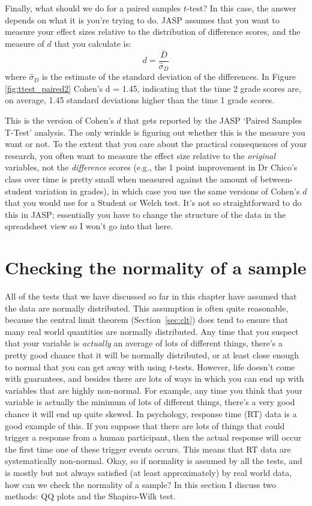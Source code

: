 
Finally, what should we do for a paired samples $t$-test? In this case, the answer depends on what it is you're trying to do. JASP assumes that you want to measure your effect sizes relative to the distribution of difference scores, and the measure of $d$ that you calculate is: 
$$
d = \frac{\bar{D}}{\hat{\sigma}_D}
$$
where $\hat{\sigma}_D$ is the estimate of the standard deviation of the differences. In Figure \ref{fig:ttest_paired2} Cohen's d = 1.45, indicating that the time 2 grade scores are, on average, 1.45 standard deviations higher than the time 1 grade scores.

This is the version of Cohen's $d$ that gets reported by the JASP `Paired Samples T-Test' analysis. The only wrinkle is figuring out whether this is the measure you want or not. To the extent that you care about the practical consequences of your research, you often want to measure the effect size relative to the {\it original} variables, not the {\it difference} scores (e.g., the 1 point improvement in Dr Chico's class over time is pretty small when measured against the amount of between-student variation in grades), in which case you use the same versions of Cohen's $d$ that you would use for a Student or Welch test. It's not so straightforward to do this in JASP; essentially you have to change the structure of the data in the spreadsheet view so I won't go into that here.


\section{Checking the normality of a sample\label{sec:shapiro}}

All of the tests that we have discussed so far in this chapter have assumed that the data are normally distributed. This assumption is often quite reasonable, because the central limit theorem (Section~\ref{sec:clt}) does tend to ensure that many real world quantities are normally distributed. Any time that you suspect that your variable is {\it actually} an average of lots of different things, there's a pretty good chance that it will be normally distributed, or at least close enough to normal that you can get away with using $t$-tests. However, life doesn't come with guarantees, and besides there are lots of ways in which you can end up with variables that are highly non-normal. For example, any time you think that your variable is actually the minimum of lots of different things, there's a very good chance it will end up quite skewed. In psychology, response time (RT) data is a good example of this. If you suppose that there are lots of things that could trigger a response from a human participant, then the actual response will occur the first time one of these trigger events occurs. This means that RT data are systematically non-normal.  Okay, so if normality is assumed by all the tests, and is mostly but not always satisfied (at least approximately) by real world data, how can we check the normality of a sample? In this section I discuss two methods: QQ plots and the Shapiro-Wilk test.

